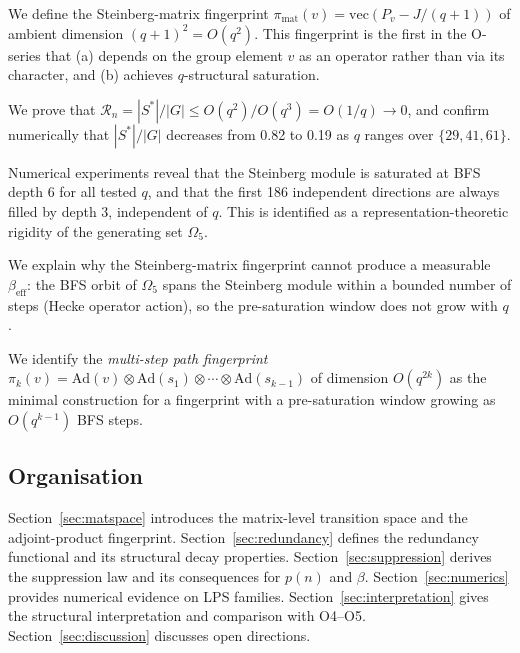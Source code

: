 \documentclass[11pt]{article}
\theoremstyle{definition}
\theoremstyle{remark}
\newcommand{\beff}{\beta_{\mathrm{eff}}}
\newcommand{\Rn}{\mathcal{R}_n}
\begin{document}
    \begin{description}[leftmargin=2em]
\item[Construction (Section~\ref{sec:matspace}).] We define the Steinberg-matrix
fingerprint $\pi_{\mathrm{mat}}(v) = \mathrm{vec}(P_v - J/(q+1))$ of ambient
dimension $(q+1)^2 = O(q^2)$.
This fingerprint is the first in the O-series that (a) depends on the group element
$v$ as an operator rather than via its character, and (b) achieves $q$-structural
saturation.

\item[$q$-structural saturation (Proposition~\ref{prop:Rn-decay}).] We prove that
$\Rn = |S^*|/|G| \leq O(q^2)/O(q^3) = O(1/q) \to 0$, and confirm numerically that
$|S^*|/|G|$ decreases from 0.82 to 0.19 as $q$ ranges over $\{29, 41, 61\}$.

\item[Universal BFS-depth rigidity (Section~\ref{ssec:saturation}).] Numerical
experiments reveal that the Steinberg module is saturated at BFS depth 6 for all
tested $q$, and that the first 186 independent directions are always filled by
depth 3, independent of $q$.
This is identified as a representation-theoretic rigidity of the generating set $\Omega_5$.

\item[Structural diagnosis (Section~\ref{ssec:stability}).] We explain why the
Steinberg-matrix fingerprint cannot produce a measurable $\beff$: the BFS orbit of
$\Omega_5$ spans the Steinberg module within a bounded number of steps (Hecke
operator action), so the pre-saturation window does not grow with $q$.

\item[Next direction (Section~\ref{ssec:open}).] We identify the \emph{multi-step
path fingerprint} $\pi_k(v) = \mathrm{Ad}(v) \otimes \mathrm{Ad}(s_1) \otimes
\cdots \otimes \mathrm{Ad}(s_{k-1})$ of dimension $O(q^{2k})$ as the minimal
construction for a fingerprint with a pre-saturation window growing as $O(q^{k-1})$
BFS steps.
    \end{description}

  \subsection{Organisation}
    \label{ssec:organisation}

    Section~\ref{sec:matspace} introduces the matrix-level transition space and
    the adjoint-product fingerprint.
    Section~\ref{sec:redundancy} defines the redundancy functional and its structural
    decay properties.
    Section~\ref{sec:suppression} derives the suppression law and its consequences for
    $p(n)$ and $\beta$.
    Section~\ref{sec:numerics} provides numerical evidence on LPS families.
    Section~\ref{sec:interpretation} gives the structural interpretation and comparison
    with O4--O5.
    Section~\ref{sec:discussion} discusses open directions.
\end{document}
